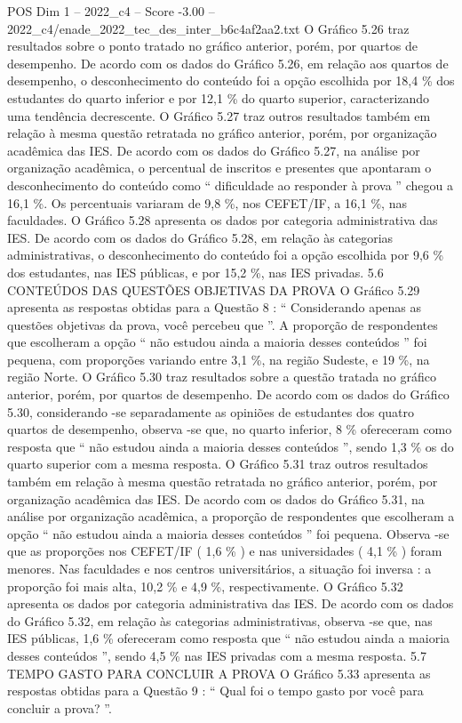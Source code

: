\begin{textsample}{POS Dim 1 – 2022\_c4 – Score -3.00 – 2022\_c4/enade\_2022\_tec\_des\_inter\_b6c4af2aa2.txt}
O Gráfico 5.26 traz resultados sobre o ponto tratado no gráfico anterior, porém, por quartos de desempenho.
De acordo com os dados do Gráfico 5.26, em relação aos quartos de desempenho, o desconhecimento do conteúdo foi a opção escolhida por 18,4 \% dos estudantes do quarto inferior e por 12,1 \% do quarto superior, caracterizando uma tendência decrescente.
O Gráfico 5.27 traz outros resultados também em relação à mesma questão retratada no gráfico anterior, porém, por organização acadêmica das IES.
De acordo com os dados do Gráfico 5.27, na análise por organização acadêmica, o percentual de inscritos e presentes que apontaram o desconhecimento do conteúdo como “ dificuldade ao responder à prova ” chegou a 16,1 \%.
Os percentuais variaram de 9,8 \%, nos CEFET/IF, a 16,1 \%, nas faculdades.
O Gráfico 5.28 apresenta os dados por categoria administrativa das IES.
De acordo com os dados do Gráfico 5.28, em relação às categorias administrativas, o desconhecimento do conteúdo foi a opção escolhida por 9,6 \% dos estudantes, nas IES públicas, e por 15,2 \%, nas IES privadas. 5.6 CONTEÚDOS DAS QUESTÕES OBJETIVAS DA PROVA O Gráfico 5.29 apresenta as respostas obtidas para a Questão 8 : “ Considerando apenas as questões objetivas da prova, você percebeu que ”.
A proporção de respondentes que escolheram a opção “ não estudou ainda a maioria desses conteúdos ” foi pequena, com proporções variando entre 3,1 \%, na região Sudeste, e 19 \%, na região Norte.
O Gráfico 5.30 traz resultados sobre a questão tratada no gráfico anterior, porém, por quartos de desempenho.
De acordo com os dados do Gráfico 5.30, considerando -se separadamente as opiniões de estudantes dos quatro quartos de desempenho, observa -se que, no quarto inferior, 8 \% ofereceram como resposta que “ não estudou ainda a maioria desses conteúdos ”, sendo 1,3 \% os do quarto superior com a mesma resposta.
O Gráfico 5.31 traz outros resultados também em relação à mesma questão retratada no gráfico anterior, porém, por organização acadêmica das IES.
De acordo com os dados do Gráfico 5.31, na análise por organização acadêmica, a proporção de respondentes que escolheram a opção “ não estudou ainda a maioria desses conteúdos ” foi pequena.
Observa -se que as proporções nos CEFET/IF ( 1,6 \% ) e nas universidades ( 4,1 \% ) foram menores.
Nas faculdades e nos centros universitários, a situação foi inversa : a proporção foi mais alta, 10,2 \% e 4,9 \%, respectivamente.
O Gráfico 5.32 apresenta os dados por categoria administrativa das IES.
De acordo com os dados do Gráfico 5.32, em relação às categorias administrativas, observa -se que, nas IES públicas, 1,6 \% ofereceram como resposta que “ não estudou ainda a maioria desses conteúdos ”, sendo 4,5 \% nas IES privadas com a mesma resposta. 5.7 TEMPO GASTO PARA CONCLUIR A PROVA O Gráfico 5.33 apresenta as respostas obtidas para a Questão 9 : “ Qual foi o tempo gasto por você para concluir a prova? ”.

\end{textsample}
